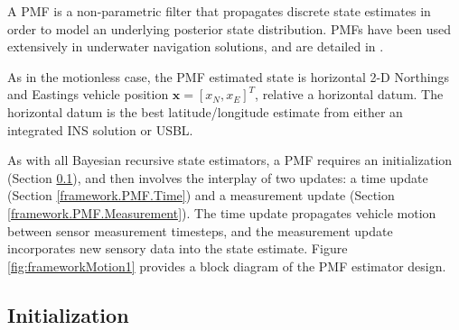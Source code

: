 A PMF is a non-parametric filter that propagates discrete state estimates in order to model an underlying posterior state distribution.
PMFs have been used extensively in underwater navigation solutions, and are detailed in \cite{Anonsen2006}.  

As in the motionless case, the PMF estimated state is horizontal 2-D Northings and Eastings vehicle position $\textbf{x} = [x_{N}, x_{E}]^{T}$, relative a horizontal datum.
The horizontal datum is the best latitude/longitude estimate from either an integrated INS solution or USBL.

As with all Bayesian recursive state estimators, a PMF requires an initialization (Section \ref{framework.PMF.Initialization}), and then involves the interplay of two updates: a time update (Section \ref{framework.PMF.Time}) and a measurement update (Section \ref{framework.PMF.Measurement}).  The time update propagates vehicle motion between sensor measurement timesteps, and the measurement update incorporates new sensory data into the state estimate.  
Figure \ref{fig:frameworkMotion1} provides a block diagram of the PMF estimator design.


\subsection{Initialization}
\label{framework.PMF.Initialization}

%
%

